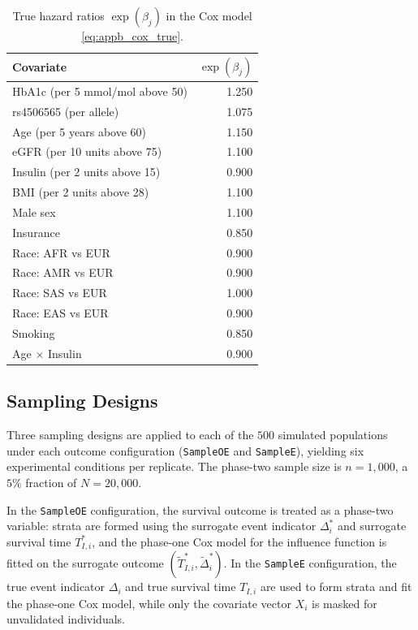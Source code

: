 \begin{table}[ht]
\centering
\caption{True hazard ratios $\exp(\beta_j)$ in the Cox model \eqref{eq:appb_cox_true}.}
\label{tab:app_cox_betas}
\small
\begin{tabular}{lr}
\hline
\textbf{Covariate} & $\exp(\beta_j)$ \\
\hline
HbA1c (per 5 mmol/mol above 50) & 1.250 \\
rs4506565 (per allele)           & 1.075 \\
Age (per 5 years above 60)       & 1.150 \\
eGFR (per 10 units above 75)     & 1.100 \\
Insulin (per 2 units above 15)   & 0.900 \\
BMI (per 2 units above 28)       & 1.100 \\
Male sex                         & 1.100 \\
Insurance                        & 0.850 \\
Race: AFR vs EUR                 & 0.900 \\
Race: AMR vs EUR                 & 0.900 \\
Race: SAS vs EUR                 & 1.000 \\
Race: EAS vs EUR                 & 0.900 \\
Smoking                          & 0.850 \\
Age $\times$ Insulin             & 0.900 \\
\hline
\end{tabular}
\end{table}

\subsection{Sampling Designs}
\label{app:sim2_sampling}

Three sampling designs are applied to each of the $500$ simulated populations under each outcome configuration (\texttt{SampleOE} and \texttt{SampleE}), yielding six experimental conditions per replicate. The phase-two sample size is $n = 1{,}000$, a $5\%$ fraction of $N = 20{,}000$.

In the \texttt{SampleOE} configuration, the survival outcome is treated as a phase-two variable: strata are formed using the surrogate event indicator $\Delta^*_i$ and surrogate survival time $T^*_{I,i}$, and the phase-one Cox model for the influence function is fitted on the surrogate outcome $(\tilde{T}_{I,i}^*, \tilde{\Delta}_i^*)$. In the \texttt{SampleE} configuration, the true event indicator $\Delta_i$ and true survival time $T_{I,i}$ are used to form strata and fit the phase-one Cox model, while only the covariate vector $X_i$ is masked for unvalidated individuals.

